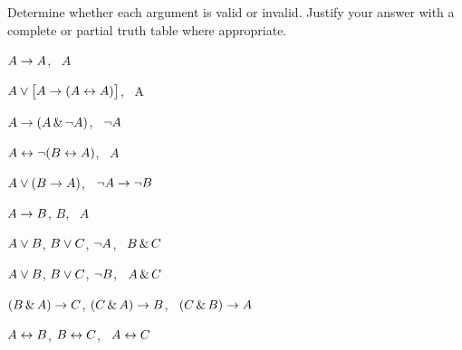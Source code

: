 \solutions
\problempart
\label{pr.TT.valid}
Determine whether each argument is valid or invalid. Justify your answer with a complete or partial truth table where appropriate.
\begin{earg}
\item $A\rightarrow A$, \therefore\ $A$ %
\item $A\vee\bigl[A\rightarrow(A\leftrightarrow A)\bigr]$, \therefore\ A %
\item $A\rightarrow(A\,\&\,\neg A)$, \therefore\ $\neg A$ %
\item $A\leftrightarrow\neg(B\leftrightarrow A)$, \therefore\ $A$ %
\item $A\vee(B\rightarrow A)$, \therefore\ $\neg A \rightarrow \neg B$ %
\item $A\rightarrow B$, $B$, \therefore\ $A$ %
\item $A\vee B$, $B\vee C$, $\neg A$, \therefore\ $B \,\&\, C$ %
\item $A\vee B$, $B\vee C$, $\neg B$, \therefore\ $A \,\&\, C$ %
\item $(B\,\&\, A)\rightarrow C$, $(C\,\&\, A)\rightarrow B$, \therefore\ $(C\,\&\, B)\rightarrow A$ %
\item $A\leftrightarrow B$, $B\leftrightarrow C$, \therefore\ $A\leftrightarrow C$ %
\end{earg}

